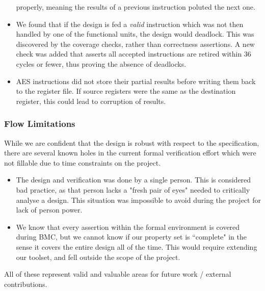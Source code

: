 \begin{itemize}
    properly, meaning the results of a previous instruction poluted the
    next one.
\item We found that if the design is fed a {\em valid} instruction which
    was not then handled by one of the functional units, the design would
    deadlock.
    This was discovered by the coverage checks, rather than correctness
    assertions.
    A new check was added that asserts all accepted instructions are
    retired within 36 cycles or fewer, thus proving the absence of
    deadlocks.
\item AES instructions did not store their partial results before
    writing them back to the register file. If source registers were the
    same as the destination register, this could lead to corruption of
    results.
\end{itemize}


\subsubsection{Flow Limitations}

While we are confident that the design is robust with respect to the
specification, there are several known holes in the current formal
verification effort which were not fillable due to time constraints on
the project.

\begin{itemize}
\item The design and verification was done by a single person. This
    is considered bad practice, as that person lacks a "fresh pair
    of eyes" needed to critically analyse a design.
    This situation was impossible to avoid during the project for
    lack of person power.
\item We know that every assertion within the formal environment is
    covered during BMC, but we cannot know if our property set is
    ``complete" in the sense it covers the entire design all of the
    time.
    This would require extending our toolset, and fell outside the
    scope of the project.
\end{itemize}

\noindent
All of these represent valid and valuable areas for future work /
external contributions.
